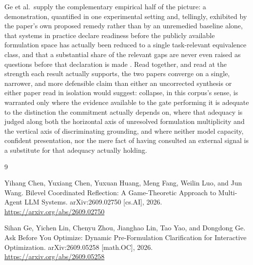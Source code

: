 \documentclass[11pt]{article}
\begin{document}
Ge et al.\ supply the complementary empirical half of the picture: a demonstration, quantified in one experimental setting and, tellingly, exhibited by the paper's own proposed remedy rather than by an unremedied baseline alone, that systems in practice declare readiness before the publicly available formulation space has actually been reduced to a single task-relevant equivalence class, and that a substantial share of the relevant gaps are never even raised as questions before that declaration is made \cite{ge2026ask}. Read together, and read at the strength each result actually supports, the two papers converge on a single, narrower, and more defensible claim than either an uncorrected synthesis or either paper read in isolation would suggest: collapse, in this corpus's sense, is warranted only where the evidence available to the gate performing it is adequate to the distinction the commitment actually depends on, where that adequacy is judged along both the horizontal axis of unresolved formulation multiplicity and the vertical axis of discriminating grounding, and where neither model capacity, confident presentation, nor the mere fact of having consulted an external signal is a substitute for that adequacy actually holding.

\begin{thebibliography}{9}

Yihang Chen, Yuxiang Chen, Yuxuan Huang, Meng Fang, Weilin Luo, and Jun Wang.
\newblock Bilevel Coordinated Reflection: A Game-Theoretic Approach to Multi-Agent LLM Systems.
\newblock arXiv:2609.02750 [cs.AI], 2026.
\newblock \url{https://arxiv.org/abs/2609.02750}

Sihan Ge, Yichen Lin, Chenyu Zhou, Jianghao Lin, Tao Yao, and Dongdong Ge.
\newblock Ask Before You Optimize: Dynamic Pre-Formulation Clarification for Interactive Optimization.
\newblock arXiv:2609.05258 [math.OC], 2026.
\newblock \url{https://arxiv.org/abs/2609.05258}

\end{thebibliography}
\end{document}
